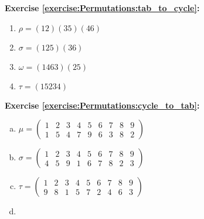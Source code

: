 \noindent\textbf{Exercise \ref{exercise:Permutations:tab_to_cycle}:} %
\begin{multicols}{2}
\begin{enumerate}[{a.}]
 
\item
$\rho = (12)(35)(46)$

\item
$\sigma = (125)(36)$

\item
$\omega = (1463)(25)$

\item
$\tau = (15234)$
\end{enumerate}
\end{multicols}

\noindent\textbf{Exercise \ref{exercise:Permutations:cycle_to_tab}:} %
\begin{enumerate}[(a)]
\item
$\mu = \begin{pmatrix}
1 & 2 & 3 & 4 & 5 & 6 & 7 & 8 & 9\\
1 & 5 & 4 & 7 & 9 & 6 & 3 & 8 & 2
\end{pmatrix}$

\item
$\sigma = \begin{pmatrix}
1 & 2 & 3 & 4 & 5 & 6 & 7 & 8 & 9\\
4 & 5 & 9 & 1 & 6 & 7 & 8 & 2 & 3
\end{pmatrix}$

\item
$\tau= \begin{pmatrix} 
1 & 2 & 3 & 4 & 5 & 6 & 7 & 8 & 9\\
9 & 8 & 1 & 5 & 7 & 2 & 4 & 6 & 3
\end{pmatrix}$

\item
\end{enumerate}

